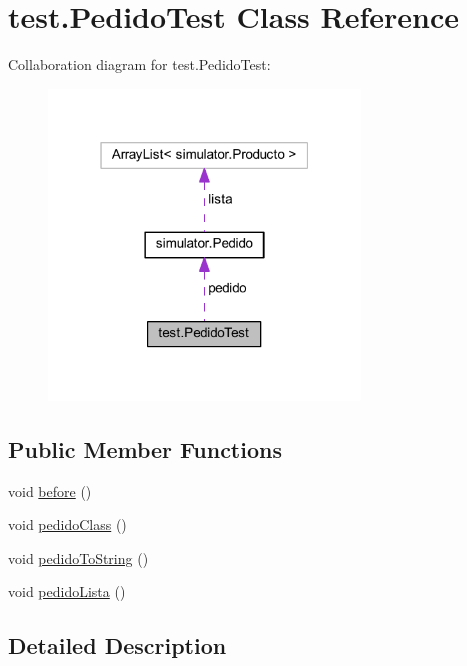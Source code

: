 \hypertarget{classtest_1_1_pedido_test}{}\section{test.\+Pedido\+Test Class Reference}
\label{classtest_1_1_pedido_test}


Collaboration diagram for test.\+Pedido\+Test\+:\nopagebreak
\begin{figure}[H]
\begin{center}
\leavevmode
\includegraphics[width=235pt]{classtest_1_1_pedido_test__coll__graph}
\end{center}
\end{figure}
\subsection*{Public Member Functions}
\begin{DoxyCompactItemize}
\item 
void \mbox{\hyperlink{classtest_1_1_pedido_test_a224f87e09063855d190a6910ba42ce1a}{before}} ()
\item 
void \mbox{\hyperlink{classtest_1_1_pedido_test_a543df9133d7a9040b22b94c1d66dbf2b}{pedido\+Class}} ()
\item 
void \mbox{\hyperlink{classtest_1_1_pedido_test_a9e3efe0a23f91c6895ab6fe5da7621cb}{pedido\+To\+String}} ()
\item 
void \mbox{\hyperlink{classtest_1_1_pedido_test_a2685ac9664dc2e9bfba5d65b5b94bfbd}{pedido\+Lista}} ()
\end{DoxyCompactItemize}


\subsection{Detailed Description}


